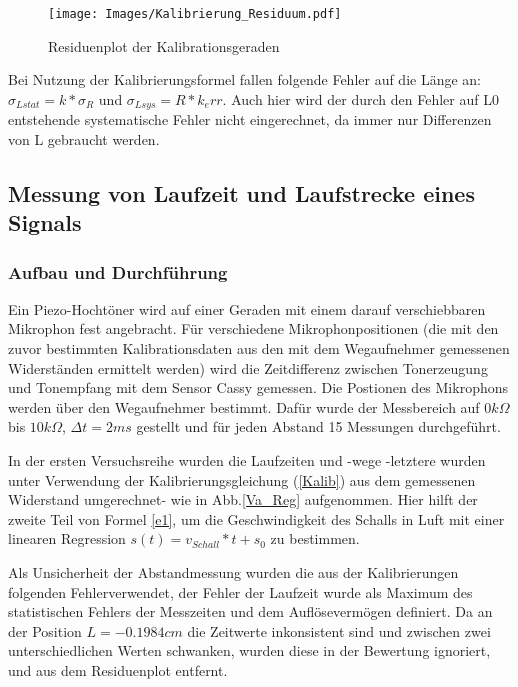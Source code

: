 \documentclass[]{article}
\begin{document}
	\begin{figure}
	\begin{center}
		\texttt{[image: Images/Kalibrierung\_Residuum.pdf]}
		\caption{Residuenplot der Kalibrationsgeraden}
		\label{Kalib_Res}
	\end{center}
	\end{figure}

	Bei Nutzung der Kalibrierungsformel fallen folgende Fehler auf die Länge an: $\sigma_{Lstat}=k*\sigma_R$ und $\sigma_{Lsys}=R*k_err$. Auch hier wird der durch den Fehler auf L0 entstehende systematische Fehler nicht eingerechnet, da immer nur Differenzen von L gebraucht werden.

	\subsection{Messung von Laufzeit und Laufstrecke eines Signals}
	\subsubsection{Aufbau und Durchführung}
	Ein Piezo-Hochtöner wird auf einer Geraden mit einem darauf verschiebbaren Mikrophon fest angebracht. Für verschiedene Mikrophonpositionen (die mit den zuvor bestimmten Kalibrationsdaten aus den mit dem Wegaufnehmer gemessenen Widerständen ermittelt werden) wird die Zeitdifferenz zwischen Tonerzeugung und Tonempfang mit dem Sensor Cassy gemessen.  Die Postionen des Mikrophons werden über den Wegaufnehmer bestimmt. Dafür wurde der Messbereich auf $0k\Omega$ bis $10k\Omega$, $\Delta t=2ms$ gestellt und für jeden Abstand 15 Messungen durchgeführt.

	In der ersten Versuchsreihe wurden die Laufzeiten und -wege -letztere wurden unter Verwendung der Kalibrierungsgleichung (\ref{Kalib}) aus dem gemessenen Widerstand umgerechnet- wie in Abb.\ref{Va_Reg} aufgenommen. Hier hilft der zweite Teil von Formel \ref{e1}, um die Geschwindigkeit des Schalls in Luft mit einer linearen Regression $s(t)=v_{Schall}*t+s_0$ zu bestimmen. 
	
	
 	Als Unsicherheit der Abstandmessung wurden die aus der Kalibrierungen folgenden Fehlerverwendet, der Fehler der Laufzeit wurde als Maximum des statistischen Fehlers der Messzeiten und dem Auflösevermögen definiert. Da an der Position $L = -0.1984 cm$ die Zeitwerte inkonsistent sind und zwischen zwei unterschiedlichen Werten schwanken, wurden diese in der Bewertung ignoriert, und aus dem Residuenplot entfernt.\\
	
\end{document}
